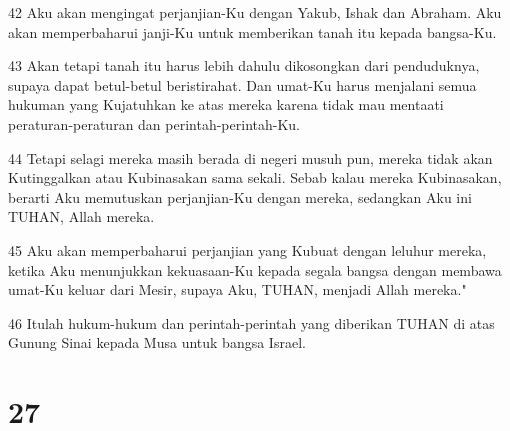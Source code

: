 \par 42 Aku akan mengingat perjanjian-Ku dengan Yakub, Ishak dan Abraham. Aku akan memperbaharui janji-Ku untuk memberikan tanah itu kepada bangsa-Ku.
\par 43 Akan tetapi tanah itu harus lebih dahulu dikosongkan dari penduduknya, supaya dapat betul-betul beristirahat. Dan umat-Ku harus menjalani semua hukuman yang Kujatuhkan ke atas mereka karena tidak mau mentaati peraturan-peraturan dan perintah-perintah-Ku.
\par 44 Tetapi selagi mereka masih berada di negeri musuh pun, mereka tidak akan Kutinggalkan atau Kubinasakan sama sekali. Sebab kalau mereka Kubinasakan, berarti Aku memutuskan perjanjian-Ku dengan mereka, sedangkan Aku ini TUHAN, Allah mereka.
\par 45 Aku akan memperbaharui perjanjian yang Kubuat dengan leluhur mereka, ketika Aku menunjukkan kekuasaan-Ku kepada segala bangsa dengan membawa umat-Ku keluar dari Mesir, supaya Aku, TUHAN, menjadi Allah mereka."
\par 46 Itulah hukum-hukum dan perintah-perintah yang diberikan TUHAN di atas Gunung Sinai kepada Musa untuk bangsa Israel.

\chapter{27}

